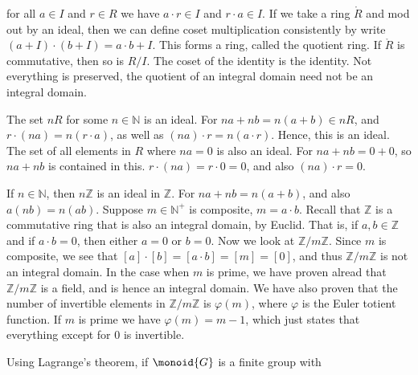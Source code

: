 \documentclass{article}                                                        %
\begin{document}
                for all $a\in{I}$ and $r\in{R}$ we have $a\cdot{r}\in{I}$ and
                $r\cdot{a}\in{I}$. If we take a ring $\ring{R}$ and mod out by
                an ideal, then we can define coset multiplication consistently
                by write $(a+I)\cdot(b+I)=a\cdot{b}+I$. This forms a ring,
                called the quotient ring. If $\ring{R}$ is commutative, then
                so is $R/I$. The coset of the identity is the identity. Not
                everything is preserved, the quotient of an integral domain
                need not be an integral domain.
                \begin{example}
                    The set $nR$ for some $n\in\mathbb{N}$ is an ideal. For
                    $na+nb=n(a+b)\in{n}R$, and $r\cdot(na)=n(r\cdot{a})$, as
                    well as $(na)\cdot{r}=n(a\cdot{r})$. Hence, this is an
                    ideal. The set of all elements in $R$ where $na=0$ is also
                    an ideal. For $na+nb=0+0$, so $na+nb$ is contained in this.
                    $r\cdot(na)=r\cdot{0}=0$, and also $(na)\cdot{r}=0$.
                \end{example}
                \begin{example}
                    If $n\in\mathbb{N}$, then $n\mathbb{Z}$ is an ideal in
                    $\mathbb{Z}$. For $na+nb=n(a+b)$, and also $a(nb)=n(ab)$.
                    Suppose $m\in\mathbb{N}^{+}$ is composite, $m=a\cdot{b}$.
                    Recall that $\mathbb{Z}$ is a commutative ring that is also
                    an integral domain, by Euclid. That is, if
                    $a,b\in\mathbb{Z}$ and if $a\cdot{b}=0$, then either $a=0$
                    or $b=0$. Now we look at $\mathbb{Z}/m\mathbb{Z}$. Since $m$
                    is composite, we see that $[a]\cdot[b]=[a\cdot{b}]=[m]=[0]$,
                    and thus $\mathbb{Z}/m\mathbb{Z}$ is not an integral domain.
                    In the case when $m$ is prime, we have proven alread that
                    $\mathbb{Z}/m\mathbb{Z}$ is a field, and is hence an
                    integral domain. We have also proven that the number of
                    invertible elements in $\mathbb{Z}/m\mathbb{Z}$ is
                    $\varphi(m)$, where $\varphi$ is the Euler totient function.
                    If $m$ is prime we have $\varphi(m)=m-1$, which just states
                    that everything except for 0 is invertible.
                \end{example}
                Using Lagrange's theorem, if $\monoid{G}$ is a finite group with
\end{document}
